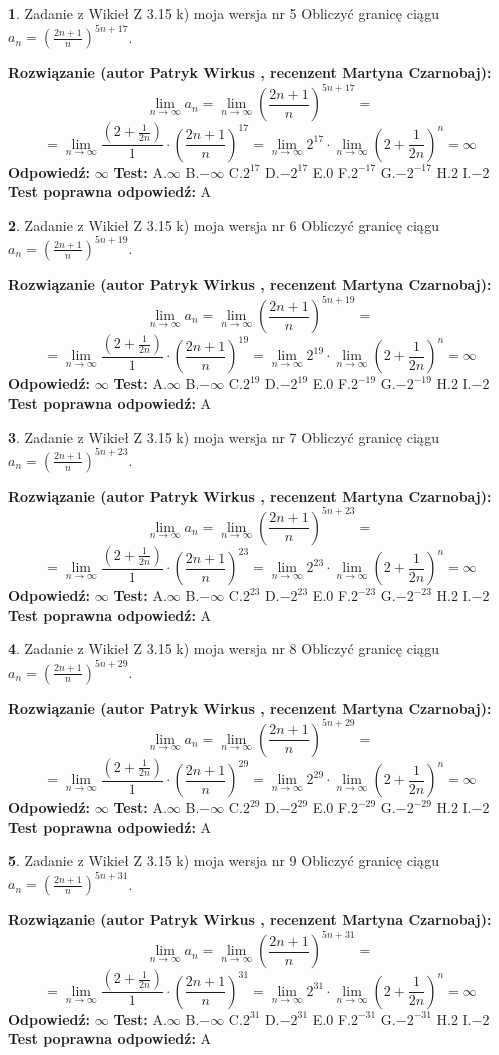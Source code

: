 \documentclass[12pt, a4paper]{article}
\theoremstyle{definition} %
\newtheorem{zad}{}
\newcommand{\zadStart}[1]{\begin{zad}#1\newline}
\newcommand{\zadStop}{\end{zad}}
\newcommand{\rozwStart}[2]{\noindent \textbf{Rozwiązanie (autor #1 , recenzent #2): }\newline}
\newcommand{\rozwStop}{\newline}
\newcommand{\odpStart}{\noindent \textbf{Odpowiedź:}\newline}
\newcommand{\odpStop}{\newline}
\newcommand{\testStart}{\noindent \textbf{Test:}\newline}
\newcommand{\testStop}{\newline}
\newcommand{\kluczStart}{\noindent \textbf{Test poprawna odpowiedź:}\newline}
\newcommand{\kluczStop}{\newline}
\begin{document}
\zadStart{Zadanie z Wikieł Z 3.15 k) moja wersja nr 5}
Obliczyć granicę ciągu $a_{n}=(\frac{2n+1}{n})^{5n+17}$.
\zadStop
\rozwStart{Patryk Wirkus}{Martyna Czarnobaj}
$$\lim\limits_{n\to\infty} a_{n} = \lim\limits_{n\to\infty}(\frac{2n+1}{n})^{5n+17}=$$
$$=\lim\limits_{n\to\infty}\frac{(2+\frac{1}{2n})}{1} \cdot (\frac{2n+1}{n})^{17} = \lim\limits_{n\to\infty} 2^{17} \cdot \lim\limits_{n\to\infty} (2+\frac{1}{2n})^{n} = \infty$$
\rozwStop
\odpStart
$\infty$
\odpStop
\testStart
A.$\infty$
B.$-\infty$
C.$2^{17}$
D.$-2^{17}$
E.$0$
F.$2^{-17}$
G.$-2^{-17}$
H.$2$
I.$-2$
\testStop
\kluczStart
A
\kluczStop



\zadStart{Zadanie z Wikieł Z 3.15 k) moja wersja nr 6}
Obliczyć granicę ciągu $a_{n}=(\frac{2n+1}{n})^{5n+19}$.
\zadStop
\rozwStart{Patryk Wirkus}{Martyna Czarnobaj}
$$\lim\limits_{n\to\infty} a_{n} = \lim\limits_{n\to\infty}(\frac{2n+1}{n})^{5n+19}=$$
$$=\lim\limits_{n\to\infty}\frac{(2+\frac{1}{2n})}{1} \cdot (\frac{2n+1}{n})^{19} = \lim\limits_{n\to\infty} 2^{19} \cdot \lim\limits_{n\to\infty} (2+\frac{1}{2n})^{n} = \infty$$
\rozwStop
\odpStart
$\infty$
\odpStop
\testStart
A.$\infty$
B.$-\infty$
C.$2^{19}$
D.$-2^{19}$
E.$0$
F.$2^{-19}$
G.$-2^{-19}$
H.$2$
I.$-2$
\testStop
\kluczStart
A
\kluczStop



\zadStart{Zadanie z Wikieł Z 3.15 k) moja wersja nr 7}
Obliczyć granicę ciągu $a_{n}=(\frac{2n+1}{n})^{5n+23}$.
\zadStop
\rozwStart{Patryk Wirkus}{Martyna Czarnobaj}
$$\lim\limits_{n\to\infty} a_{n} = \lim\limits_{n\to\infty}(\frac{2n+1}{n})^{5n+23}=$$
$$=\lim\limits_{n\to\infty}\frac{(2+\frac{1}{2n})}{1} \cdot (\frac{2n+1}{n})^{23} = \lim\limits_{n\to\infty} 2^{23} \cdot \lim\limits_{n\to\infty} (2+\frac{1}{2n})^{n} = \infty$$
\rozwStop
\odpStart
$\infty$
\odpStop
\testStart
A.$\infty$
B.$-\infty$
C.$2^{23}$
D.$-2^{23}$
E.$0$
F.$2^{-23}$
G.$-2^{-23}$
H.$2$
I.$-2$
\testStop
\kluczStart
A
\kluczStop



\zadStart{Zadanie z Wikieł Z 3.15 k) moja wersja nr 8}
Obliczyć granicę ciągu $a_{n}=(\frac{2n+1}{n})^{5n+29}$.
\zadStop
\rozwStart{Patryk Wirkus}{Martyna Czarnobaj}
$$\lim\limits_{n\to\infty} a_{n} = \lim\limits_{n\to\infty}(\frac{2n+1}{n})^{5n+29}=$$
$$=\lim\limits_{n\to\infty}\frac{(2+\frac{1}{2n})}{1} \cdot (\frac{2n+1}{n})^{29} = \lim\limits_{n\to\infty} 2^{29} \cdot \lim\limits_{n\to\infty} (2+\frac{1}{2n})^{n} = \infty$$
\rozwStop
\odpStart
$\infty$
\odpStop
\testStart
A.$\infty$
B.$-\infty$
C.$2^{29}$
D.$-2^{29}$
E.$0$
F.$2^{-29}$
G.$-2^{-29}$
H.$2$
I.$-2$
\testStop
\kluczStart
A
\kluczStop



\zadStart{Zadanie z Wikieł Z 3.15 k) moja wersja nr 9}
Obliczyć granicę ciągu $a_{n}=(\frac{2n+1}{n})^{5n+31}$.
\zadStop
\rozwStart{Patryk Wirkus}{Martyna Czarnobaj}
$$\lim\limits_{n\to\infty} a_{n} = \lim\limits_{n\to\infty}(\frac{2n+1}{n})^{5n+31}=$$
$$=\lim\limits_{n\to\infty}\frac{(2+\frac{1}{2n})}{1} \cdot (\frac{2n+1}{n})^{31} = \lim\limits_{n\to\infty} 2^{31} \cdot \lim\limits_{n\to\infty} (2+\frac{1}{2n})^{n} = \infty$$
\rozwStop
\odpStart
$\infty$
\odpStop
\testStart
A.$\infty$
B.$-\infty$
C.$2^{31}$
D.$-2^{31}$
E.$0$
F.$2^{-31}$
G.$-2^{-31}$
H.$2$
I.$-2$
\testStop
\kluczStart
A
\kluczStop
\end{document}
